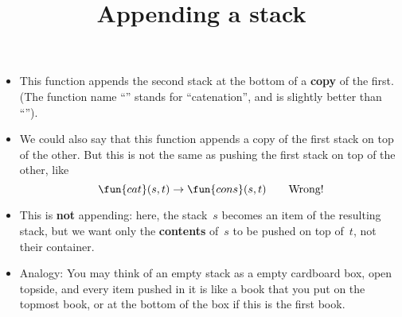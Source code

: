 \documentclass[wide]{slides}
\begin{document}
\begin{slide}
  \title{Appending a stack}

  \begin{itemize}

    \item This function appends the second stack at the bottom of a
      \textbf{copy} of the first. (The function name ``''
      stands for ``catenation'', and is slightly better than
      ``'').

    \item We could also say that this function appends a copy of the
      first stack on top of the other. But this is not the same as
      pushing the first stack on top of the other, like
      \bigskip
      \begin{equation*}
        \fun{cat}(s,t) \rightarrow \fun{cons}(s,t) \qquad
        \text{Wrong!}
      \end{equation*}
      \smallskip

    \item This is \textbf{not} appending: here, the stack~\(s\)
      becomes an item of the resulting stack, but we want only the
      \textbf{contents} of~\(s\) to be pushed on top of~\(t\), not
      their container.

    \item Analogy: You may think of an empty stack as a empty
      cardboard box, open topside, and every item pushed in it is like
      a book that you put on the topmost book, or at the bottom of the
      box if this is the first book.

  \end{itemize}

\end{slide}
\end{document}
